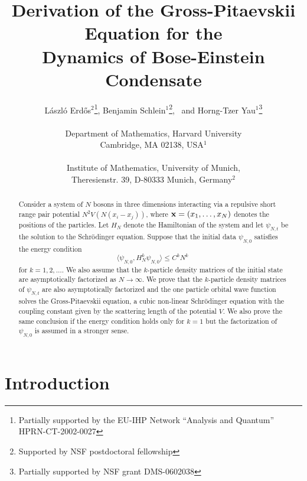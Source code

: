 \documentclass[11pt]{article}
\newcommand{\bx}{{\bf x}}
\begin{document}
\title{Derivation of the Gross-Pitaevskii Equation for the \\
Dynamics of Bose-Einstein Condensate}
\author{L\'aszl\'o Erd\H os${}^2$\thanks{Partially
supported by the EU-IHP Network ``Analysis and Quantum''
HPRN-CT-2002-0027}\;, Benjamin Schlein${}^1$\thanks{Supported by NSF
postdoctoral fellowship}, \, and Horng-Tzer
Yau${}^1$\thanks{Partially supported by NSF grant
DMS-0602038} \\
\\
Department of Mathematics, Harvard University\\ Cambridge, MA 02138, USA${}^1$ \\ \\
Institute of Mathematics, University of Munich, \\
Theresienstr. 39, D-80333 Munich, Germany${}^2$
\\}

\maketitle




\begin{abstract}
Consider a system of $N$ bosons  in three dimensions interacting via
a repulsive short range pair potential $N^2V(N(x_i-x_j))$, where
$\bx=(x_1, \ldots, x_N)$ denotes the positions of the particles. Let
$H_N$ denote the Hamiltonian of the system and  let $\psi_{N,t}$ be
the solution to the Schr\"odinger equation.  Suppose that the
initial data $\psi_{N,0}$ satisfies the energy condition
\[ \langle
\psi_{N,0},  H_N^k \psi_{N,0} \rangle \leq C^k N^k \;
\]
for $k=1,2,\ldots $.
 We also assume that
the $k$-particle density matrices of the initial state are
asymptotically
 factorized as $N\to\infty$.
 We prove that
the $k$-particle density matrices of $\psi_{N,t}$ are also
asymptotically
 factorized  and  the one particle orbital wave function solves the
Gross-Pitaevskii equation, a cubic non-linear Schr\"odinger equation
with the coupling constant given by the scattering length of the
potential $V$. We also prove the same conclusion if the energy
condition holds only for $k=1$ but the factorization of $\psi_{N,0}$
is assumed in a stronger sense.




\end{abstract}


\section{Introduction}\label{sec:intro}
\end{document}
